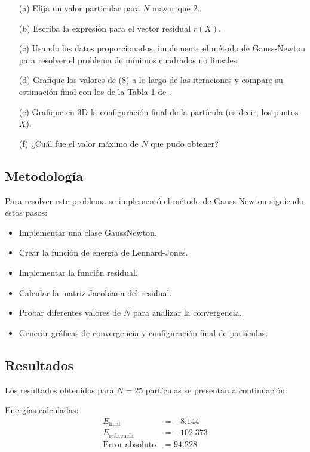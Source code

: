 \documentclass{article}
\begin{document}
\begin{itemize}
    \item[(a)] Elija un valor particular para $N$ mayor que 2.
    \item[(b)] Escriba la expresión para el vector residual $r(X)$.
    \item[(c)] Usando los datos proporcionados, implemente el método de Gauss-Newton para resolver el problema de mínimos cuadrados no lineales.
    \item[(d)] Grafique los valores de (8) a lo largo de las iteraciones y compare su estimación final con los de la Tabla 1 de \cite{wales1997}.
    \item[(e)] Grafique en 3D la configuración final de la partícula (es decir, los puntos $X$).
    \item[(f)] ¿Cuál fue el valor máximo de $N$ que pudo obtener?
\end{itemize}

\subsection{Metodología}

Para resolver este problema se implementó el método de Gauss-Newton siguiendo estos pasos:

\begin{itemize}
    \item Implementar una clase GaussNewton.
    \item Crear la función de energía de Lennard-Jones.
    \item Implementar la función residual.
    \item Calcular la matriz Jacobiana del residual.
    \item Probar diferentes valores de $N$ para analizar la convergencia.
    \item Generar gráficas de convergencia y configuración final de partículas.
\end{itemize}

\subsection{Resultados}
\setcounter{equation}{0}

Los resultados obtenidos para $N = 25$ partículas se presentan a continuación:

Energías calculadas:
\begin{align}
    E_{\text{final}} &= -8.144 \\
    E_{\text{referencia}} &= -102.373 \\
    \text{Error absoluto} &= 94.228
\end{align}
\end{document}
